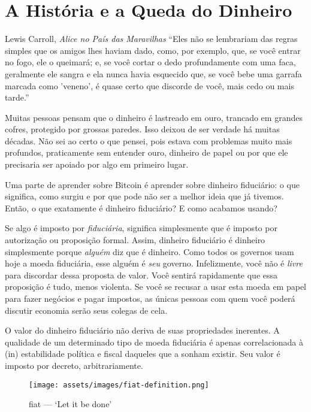 \chapter{A História e a Queda do Dinheiro}
\label{les:12}

\begin{chapquote}{Lewis Carroll, \textit{Alice no País das Maravilhas}}
\enquote{Eles não se lembrariam das regras simples que os amigos lhes haviam dado, 
como, por exemplo, que, se você entrar no fogo, ele o queimará; e, se você cortar
o dedo profundamente com uma faca, geralmente ele sangra e ela nunca havia 
esquecido que, se você bebe uma garrafa marcada como 'veneno', é quase certo que 
discorde de você, mais cedo ou mais tarde.}
\end{chapquote}

Muitas pessoas pensam que o dinheiro é lastreado em ouro, trancado em grandes cofres, 
protegido por grossas paredes. Isso deixou de ser verdade há muitas décadas. Não sei 
ao certo o que pensei, pois estava com problemas muito mais profundos, praticamente 
sem entender ouro, dinheiro de papel ou por que ele precisaria ser apoiado por algo 
em primeiro lugar.

Uma parte de aprender sobre Bitcoin é aprender sobre dinheiro fiduciário: o que 
significa, como surgiu e por que pode não ser a melhor ideia que já tivemos. Então, 
o que exatamente é dinheiro fiduciário? E como acabamos usando?

Se algo é imposto por \textit{fiduciária}, significa simplesmente que é imposto por 
autorização ou proposição formal. Assim, dinheiro fiduciário é dinheiro simplesmente 
porque \textit{alguém} diz que é dinheiro. Como todos os governos usam hoje a moeda 
fiduciária, esse alguém é \textit{seu} governo. Infelizmente, você não é \textit{livre}
para discordar dessa proposta de valor. Você sentirá rapidamente que essa proposição 
é tudo, menos violenta. Se você se recusar a usar esta moeda em papel para fazer 
negócios e pagar impostos, as únicas pessoas com quem você poderá discutir economia 
serão seus colegas de cela.

O valor do dinheiro fiduciário não deriva de suas propriedades inerentes. A qualidade 
de um determinado tipo de moeda fiduciária é apenas correlacionada à (in) estabilidade
política e fiscal daqueles que a sonham existir. Seu valor é imposto por decreto, 
arbitrariamente.

\begin{figure}
  \centering
  \texttt{[image: assets/images/fiat-definition.png]}
  \caption{fiat --- `Let it be done'}
  \label{fig:fiat-definition}
\end{figure}

